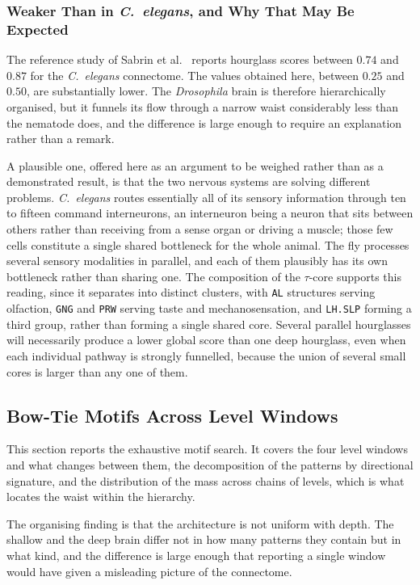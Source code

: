 \documentclass[12pt,a4paper,oneside]{article}
\theoremstyle{definition}
\theoremstyle{plain}
\newcommand{\Dros}{\textit{Drosophila}}
\newcommand{\code}[1]{\texttt{#1}}
\begin{document}
\subsubsection{Weaker Than in \textit{C.\ elegans}, and Why That May Be
Expected}

The reference study of Sabrin et al.\ \cite{sabrin2020} reports hourglass
scores between $0.74$ and $0.87$ for the \textit{C.\ elegans} connectome.
The values obtained here, between $0.25$ and $0.50$, are substantially
lower. The \Dros{} brain is therefore hierarchically organised, but it
funnels its flow through a narrow waist considerably less than the nematode
does, and the difference is large enough to require an explanation rather
than a remark.

A plausible one, offered here as an argument to be weighed rather than as a
demonstrated result, is that the two nervous systems are solving different
problems. \textit{C.\ elegans} routes essentially all of its sensory
information through ten to fifteen command interneurons, an interneuron being
a neuron that sits between others rather than receiving from a sense organ or
driving a muscle; those few cells constitute a single shared bottleneck for
the whole animal. The fly processes several
sensory modalities in parallel, and each of them plausibly has its own
bottleneck rather than sharing one. The composition of the $\tau$-core
supports this reading, since it separates into distinct clusters, with
\code{AL} structures serving olfaction, \code{GNG} and \code{PRW} serving
taste and mechanosensation, and \code{LH.SLP} forming a third group, rather
than forming a single shared core. Several parallel hourglasses will
necessarily produce a lower global score than one deep hourglass, even when
each individual pathway is strongly funnelled, because the union of several
small cores is larger than any one of them.

\subsection{Bow-Tie Motifs Across Level Windows}
\label{sec:results-windows}


This section reports the exhaustive motif search. It covers the four level
windows and what changes between them, the decomposition of the patterns by
directional signature, and the distribution of the mass across chains of
levels, which is what locates the waist within the hierarchy.

The organising finding is that the architecture is not uniform with depth.
The shallow and the deep brain differ not in how many patterns they contain
but in what kind, and the difference is large enough that reporting a single
window would have given a misleading picture of the connectome.
\end{document}
